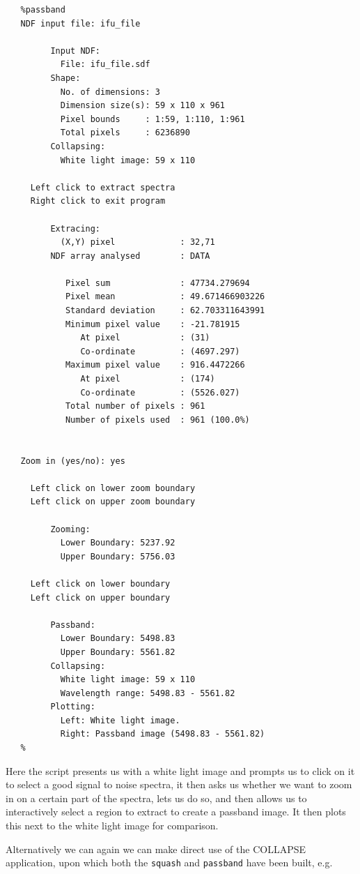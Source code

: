 \documentclass[twoside,11pt]{article}
\newcommand{\xref}[3]{#1}
\begin{document}
\small\begin{verbatim}
   %passband
   NDF input file: ifu_file
         
         Input NDF:
           File: ifu_file.sdf
         Shape:
           No. of dimensions: 3
           Dimension size(s): 59 x 110 x 961
           Pixel bounds     : 1:59, 1:110, 1:961
           Total pixels     : 6236890
         Collapsing:
           White light image: 59 x 110
 
     Left click to extract spectra
     Right click to exit program
 
         Extracing:
           (X,Y) pixel             : 32,71
         NDF array analysed        : DATA

            Pixel sum              : 47734.279694
            Pixel mean             : 49.671466903226
            Standard deviation     : 62.703311643991
            Minimum pixel value    : -21.781915
               At pixel            : (31)
               Co-ordinate         : (4697.297)
            Maximum pixel value    : 916.4472266
               At pixel            : (174)
               Co-ordinate         : (5526.027)
            Total number of pixels : 961
            Number of pixels used  : 961 (100.0%)

 
   Zoom in (yes/no): yes
 
     Left click on lower zoom boundary
     Left click on upper zoom boundary
 
         Zooming:
           Lower Boundary: 5237.92
           Upper Boundary: 5756.03
 
     Left click on lower boundary
     Left click on upper boundary
 
         Passband:
           Lower Boundary: 5498.83
           Upper Boundary: 5561.82
         Collapsing:
           White light image: 59 x 110
           Wavelength range: 5498.83 - 5561.82
         Plotting:
           Left: White light image.
           Right: Passband image (5498.83 - 5561.82)
   %
\end{verbatim}\normalsize

Here the script presents us with a white light image and prompts us to click on it to select a good signal to noise spectra, it then asks us whether we want to zoom in on a certain part of the spectra, lets us do so, and then allows us to interactively select a region to extract to create a passband image. It then plots this next to the white light image for comparison.

Alternatively we can again we can make direct use of the COLLAPSE application, upon which both the \xref{{\tt squash}}{sun237}{squash} and \xref{{\tt passband}}{sun237}{passband} have been built, e.g.\
\end{document}
